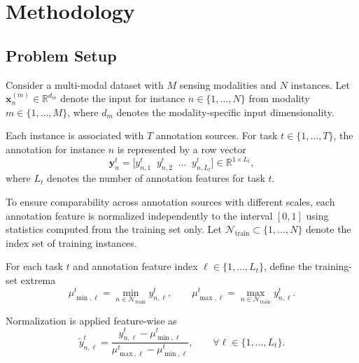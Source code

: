 \documentclass[10pt,twocolumn,letterpaper]{article}
\begin{document}
\section{Methodology}
\label{sec:methodology}

\subsection{Problem Setup}
\label{subsec:problem-setup}

Consider a multi-modal dataset with $M$ sensing modalities and $N$ instances.
Let $\mathbf{x}_n^{(m)} \in \mathbb{R}^{d_m}$ denote the input for instance
$n \in \{1,\dots,N\}$ from modality $m \in \{1,\dots,M\}$, where $d_m$
denotes the modality-specific input dimensionality.

Each instance is associated with $T$ annotation sources.
For task $t \in \{1,\dots,T\}$, the annotation for instance $n$ is represented
by a row vector
\[
\mathbf{y}^{t}_{n}
=
\big[
y^{t}_{n,1}\;\; y^{t}_{n,2}\;\; \dots\;\; y^{t}_{n,L_t}
\big]
\in \mathbb{R}^{1 \times L_t},
\]
where $L_t$ denotes the number of annotation features for task $t$.

To ensure comparability across annotation sources with different scales,
each annotation feature is normalized independently to the interval $[0,1]$
using statistics computed from the training set only.
Let $\mathcal{N}_{\mathrm{train}} \subset \{1,\dots,N\}$ denote the index set of
training instances.

For each task $t$ and annotation feature index $\ell \in \{1,\dots,L_t\}$, define the
training-set extrema
\[
\mu^{t}_{\min,\ell}
=
\min_{n \in \mathcal{N}_{\mathrm{train}}} y^{t}_{n,\ell},
\qquad
\mu^{t}_{\max,\ell}
=
\max_{n \in \mathcal{N}_{\mathrm{train}}} y^{t}_{n,\ell}.
\]

\noindent Normalization is applied feature-wise as
\begin{equation}
\label{eq:ann-norm}
\tilde{y}^{t}_{n,\ell}
=
\frac{
y^{t}_{n,\ell}
-
\mu^{t}_{\min,\ell}
}{
\mu^{t}_{\max,\ell}
-
\mu^{t}_{\min,\ell}
},
\qquad
\forall \ell \in \{1,\dots,L_t\}.
\end{equation}
\end{document}
